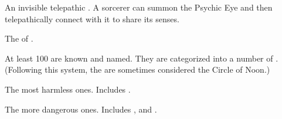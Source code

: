 \begin{gloss}
\begin{comment}
\paragraph{Psychic Eye}
\end{comment}
An invisible telepathic \daemon. 
A sorcerer can summon the Psychic Eye and then telepathically connect with it to share its senses. 









\begin{comment}
\paragraph{\qliphah}
\end{comment}
\gitem[\qliphoth]{\qliphah}
The  of . 

At least 100 \qliphoth{} are known and named. 
They are categorized into a number of . 
(Following this system, the  are sometimes considered the Circle of Noon.) 





\begin{subgloss}
  \begin{comment}
  \subparagraph{Circle of Dusk}
  \end{comment}
  The most harmless ones. 
  \index{\Gavron}
  Includes \Gavron. 




  \begin{comment}
  \subparagraph{Circle of Twilight}
  \end{comment}
  The more dangerous ones. 
  \index{\Djerzad}
  \index{\Iphicoss}
  \index{\Kithvaz}
  Includes \Djerzad, \Iphicoss{} and \Kithvaz. 





\end{subgloss}
\end{gloss}
